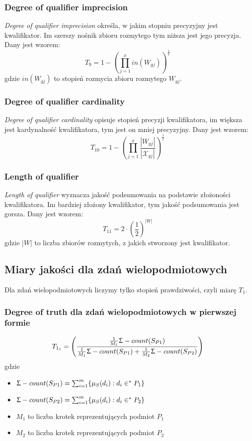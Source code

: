 \documentclass{classrep}
\begin{document}
	\subsubsection{Degree of qualifier imprecision}
\textsl{Degree of qualifier imprecision} określa, w jakim stopniu precyzyjny jest kwalifikator. Im szerszy nośnik zbioru rozmytego tym niższa jest jego precyzja. Dany jest wzorem:
\begin{equation}
T_{9} = 1 - \left(\prod_{j=1}^{x} in(W_{gj})\right)^{\frac{1}{x}}
\end{equation}
gdzie $in(W_{gj})$ to stopień rozmycia zbioru rozmytego $W_{gj}$.


	\subsubsection{Degree of qualifier cardinality}
\textsl{Degree of qualifier cardinality} opisuje stopień precyzji kwalifikatora, im większa jest kardynalność kwalifikatora, tym jest on mniej precyzyjny. Dany jest wzorem:
\begin{equation}
T_{10} = 1- \left(\prod_{j=1}^{x} \frac{|W_{gj}|}{|\mathcal{X}_{gj}|}\right)^{\frac{1}{x}}
\end{equation}


	\subsubsection{Length of qualifier}
\textsl{Length of qualifier} wyznacza jakość podsumowania na podstawie złożoności kwalifikatora. Im bardziej złożony kwalifikator, tym jakość podsumowania jest gorsza. Dany jest wzorem:
\begin{equation}
T_{11} = 2 \cdot \left(\frac{1}{2}\right)^{|W|}
\end{equation}
gdzie $|W|$ to liczba zbiorów rozmytych, z jakich stworzony jest kwalifikator.

\subsection{Miary jakości dla zdań wielopodmiotowych}
Dla zdań wielopodmiotowych liczymy tylko stopień prawdziwości, czyli miarę $T_1$.

\subsubsection{Degree of truth dla zdań wielopodmiotowych w pierwszej formie \cite{anarticle30}} 
\begin{equation}
T_{1_1} = \left(\frac{\frac{1}{M_1} \Upsigma-count(S_{P1})}
				{\frac{1}{M_1} \Upsigma-count(S_{P1}) + \frac{1}{M_2} \Upsigma-count(S_{P2})}\right)
\end{equation}
gdzie 
\begin{itemize}
	\item $\Upsigma-count(S_{P1}) = \sum_{i=1}^{m} \{\mu_{S}(d_i) : d_i \in^* P_1\}$
	\item $\Upsigma-count(S_{P2}) = \sum_{i=1}^{m} \{\mu_{S}(d_i) : d_i \in^* P_2\}$
	\item $M_1$ to liczba krotek reprezentujących podmiot $P_1$
	\item $M_2$ to liczba krotek reprezentujących podmiot $P_2$
\end{itemize}
\end{document}
